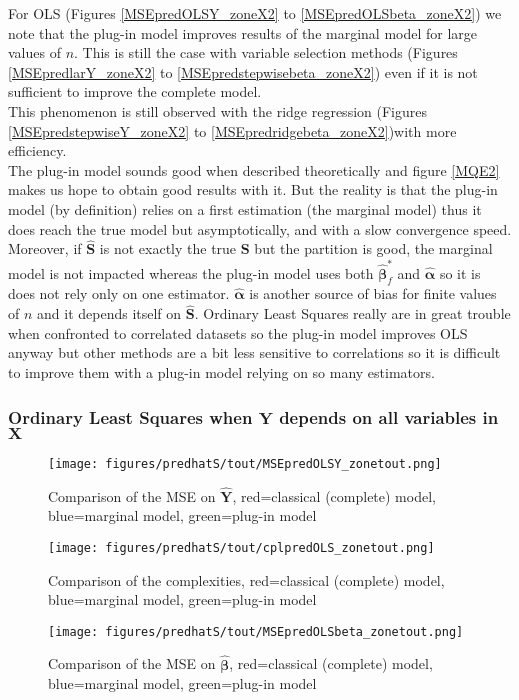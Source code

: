 \documentclass[12pt,a4paper]{report}
\begin{document}
For OLS (Figures \ref{MSEpredOLSY_zoneX2} to \ref{MSEpredOLSbeta_zoneX2}) we note that the plug-in model improves results of the marginal model for large values of $n$. This is still the case with variable selection methods (Figures \ref{MSEpredlarY_zoneX2} to \ref{MSEpredstepwisebeta_zoneX2}) even if it is not sufficient to improve the complete model. \\
This phenomenon is still observed with the ridge regression (Figures \ref{MSEpredstepwiseY_zoneX2} to \ref{MSEpredridgebeta_zoneX2})with more efficiency.\\

	The plug-in model sounds good when described theoretically and figure \ref{MQE2} makes us hope to obtain good results with it. But the reality is that the plug-in model (by definition) relies on a first estimation (the marginal model) thus it does reach the true model but asymptotically, and with a slow convergence speed. Moreover, if $\hat{\boldsymbol{S}}$ is not exactly the true $\boldsymbol{S}$ but the partition is good, the marginal model is not impacted whereas the plug-in model uses both $\hat{\boldsymbol{\beta}}^*_{f}$ and $\hat{\boldsymbol{\alpha}}$ so it is does not rely only on one estimator. $\hat{\boldsymbol{\alpha}}$ is another source of bias for finite values of $n$ and it depends itself on $\hat{\boldsymbol{S}}$. Ordinary Least Squares really are in great trouble when confronted to correlated datasets so the plug-in model improves OLS anyway but other methods are a bit less sensitive to correlations so it is difficult to improve them with a plug-in model relying on so many estimators. 

 
 
\FloatBarrier

\newpage
\subsubsection{Ordinary Least Squares when $\boldsymbol{Y}$ depends on all variables in $\boldsymbol{X}$}
	\begin{figure}[h!]
	\centering
		  \texttt{[image: figures/predhatS/tout/MSEpredOLSY\_zonetout.png]}
		\caption{Comparison of the MSE on $\hat{\boldsymbol{Y}}$, red=classical (complete) model, blue=marginal model, green=plug-in model}\label{MSEpredOLSY_zonetout}
	\end{figure}
	\begin{figure}[h!]
	\centering
		  \texttt{[image: figures/predhatS/tout/cplpredOLS\_zonetout.png]}
		\caption{Comparison of the complexities, red=classical (complete) model, blue=marginal model, green=plug-in model}\label{cplpredOLS_zonetout}
	\end{figure}
	\begin{figure}[h!]
	\centering
		  \texttt{[image: figures/predhatS/tout/MSEpredOLSbeta\_zonetout.png]}
		\caption{Comparison of the MSE on $\hat{\boldsymbol{\beta}}$, red=classical (complete) model, blue=marginal model, green=plug-in model}\label{MSEpredOLSbeta_zonetout}
	\end{figure}
	\FloatBarrier
	
\end{document}

